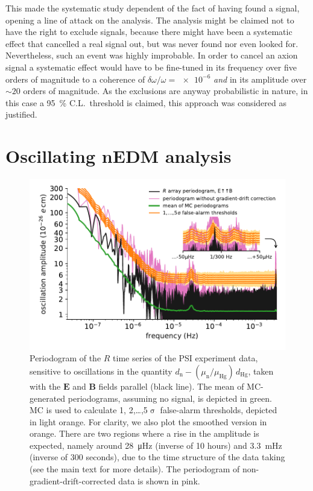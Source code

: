 This made the systematic study dependent of the fact of having found a signal, opening a line of attack on the analysis.
The analysis might be claimed not to have the right to exclude signals, because there might have been a systematic effect that cancelled a real signal out, but was never found nor even looked for.
Nevertheless, such an event was highly improbable.
In order to cancel an axion signal a systematic effect would have to be fine-tuned in its frequency over five orders of magnitude to a coherence of $\delta \omega / \omega = \num{e-6}$ \emph{and} in its amplitude over $\sim 20$ orders of magnitude.
As the exclusions are anyway probabilistic in nature, in this case a \SI{95}{\percent} C.L.\ threshold is claimed, this approach was considered as justified.




\section{Oscillating nEDM analysis}
\begin{figure}
  \centering
  \includegraphics[width=\linewidth]{gfx/axions/detection_psi_inset_gc.pdf}
  \caption{Periodogram of the $R$ time series of the PSI experiment data, sensitive to oscillations in the quantity $d_\mathrm{n} - \left( \mu_\mathrm{n} / \mu_\mathrm{Hg} \right) \, d_\mathrm{Hg}$, taken with the $\mathbf{E}$ and $\mathbf{B}$ fields parallel (black line).
  The mean of MC-generated periodograms, assuming no signal, is depicted in green. MC is used to calculate 1, 2,…,5$\upsigma$ false-alarm thresholds, depicted in light orange.
  For clarity, we also plot the smoothed version in orange.
  There are two regions where a rise in the amplitude is expected, namely around \SI{28}{\micro\hertz} (inverse of 10 hours) and \SI{3.3}{\milli\hertz} (inverse of 300 seconds), due to the time structure of the data taking (see the main text for more details). The periodogram of non-gradient-drift-corrected data is shown in pink.}\label{fig:axions_PSI_detection}
\end{figure}

